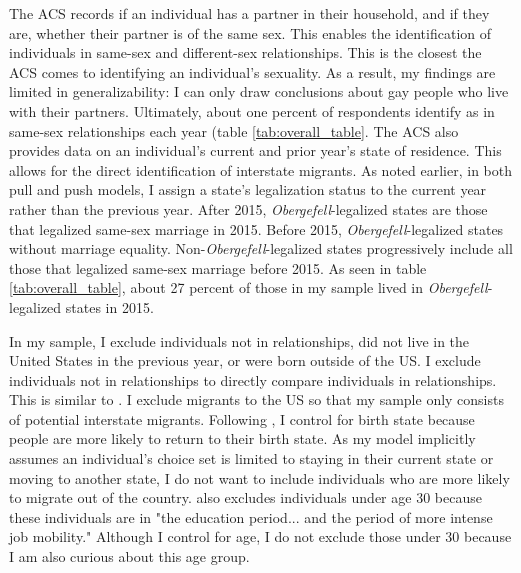 \documentclass[12pt,letterpaper]{article}
\begin{document}
The ACS records if an individual has a partner in their household, and if they are, whether their partner is of the same sex. This enables the identification of individuals in same-sex and different-sex relationships. This is the closest the ACS comes to identifying an individual's sexuality. As a result, my findings are limited in generalizability: I can only draw conclusions about gay people who live with their partners. Ultimately, about one percent of respondents identify as in same-sex relationships each year (table \ref{tab:overall_table}. The ACS also provides data on an individual's current and prior year's state of residence. This allows for the direct identification of interstate migrants. As noted earlier, in both pull and push models, I assign a state's legalization status to the current year rather than the previous year. After 2015, \textit{Obergefell}-legalized states are those that legalized same-sex marriage in 2015. Before 2015, \textit{Obergefell}-legalized states without marriage equality. Non-\textit{Obergefell}-legalized states progressively include all those that legalized same-sex marriage before 2015. As seen in table \ref{tab:overall_table}, about 27 percent of those in my sample lived in \textit{Obergefell}-legalized states in 2015.
\FloatBarrier



In my sample, I exclude individuals not in relationships, did not live in the United States in the previous year, or were born outside of the US. I exclude individuals not in relationships to directly compare individuals in relationships. This is similar to \citet{1}. I exclude migrants to the US so that my sample only consists of potential interstate migrants. Following \citet{12}, I control for birth state because people are more likely to return to their birth state. As my model implicitly assumes an individual's choice set is limited to staying in their current state or moving to another state, I do not want to include individuals who are more likely to migrate out of the country. \citet{1} also excludes individuals under age 30 because these individuals are in "the education period... and the period of more intense job mobility." Although I control for age, I do not exclude those under 30 because I am also curious about this age group.
\end{document}
